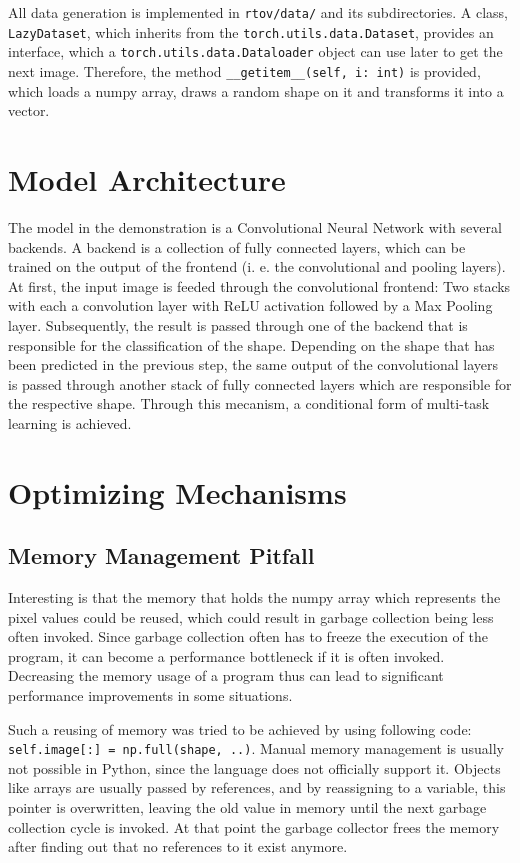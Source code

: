 \documentclass[12pt, a4paper, titlepage]{report}
\begin{document}
All data generation is implemented in \lstinline{rtov/data/} and its subdirectories. A class, \lstinline{LazyDataset}, which inherits from the \lstinline{torch.utils.data.Dataset}, provides an interface, which a \lstinline{torch.utils.data.Dataloader} object can use later to get the next image. Therefore, the method \lstinline{__getitem__(self, i: int)} is provided, which loads a numpy array, draws a random shape on it and transforms it into a vector.

\section{Model Architecture}

The model in the demonstration is a Convolutional Neural Network with several backends. A backend is a collection of fully connected layers, which can be trained on the output of the frontend (i. e. the convolutional and pooling layers). At first, the input image is feeded through the convolutional frontend: Two stacks with each a convolution layer with ReLU activation followed by a Max Pooling layer. Subsequently, the result is passed through one of the backend that is responsible for the classification of the shape. Depending on the shape that has been predicted in the previous step, the same output of the convolutional layers is passed through another stack of fully connected layers which are responsible for the respective shape. Through this mecanism, a conditional form of multi-task learning is achieved.

\section{Optimizing Mechanisms}

\subsection{Memory Management Pitfall}

Interesting is that the memory that holds the numpy array which represents the pixel values could be reused, which could result in garbage collection being less often invoked. Since garbage collection often has to freeze the execution of the program, it can become a performance bottleneck if it is often invoked.      %
Decreasing the memory usage of a program thus can lead to significant performance improvements in some situations.

Such a reusing of memory was tried to be achieved by using following code: \lstinline{self.image[:] = np.full(shape, ..)}. Manual memory management is usually not possible in Python, since the language does not officially support it. Objects like arrays are usually passed by references, and by reassigning to a variable, this pointer is overwritten, leaving the old value in memory until the next garbage collection cycle is invoked. At that point the garbage collector frees the memory after finding out that no references to it exist anymore.      %
\end{document}
